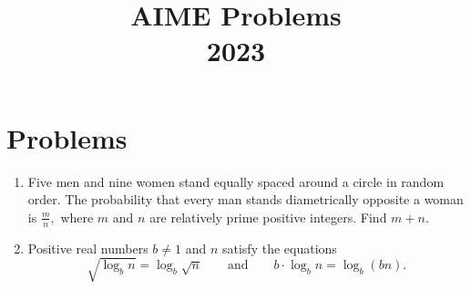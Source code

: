 \documentclass{article}
\title{AIME Problems \\ 2023}
\date{}
\begin{document}
\maketitle\thispagestyle{fancy}\newpage\section*{Problems}\begin{enumerate}[label=\arabic*., itemsep=0.5em]\item Five men and nine women stand equally spaced around a circle in random order. The probability that every man stands diametrically opposite a woman is $\frac{m}{n},$ where $m$ and $n$ are relatively prime positive integers. Find $m+n.$\par \vspace{0.5em}\item Positive real numbers $b \not= 1$ and $n$ satisfy the equations 
\begin{equation*}
\sqrt{\log_b n} = \log_b \sqrt{n} \qquad \text{and} \qquad b \cdot \log_b n = \log_b (bn).
\end{equation*}

\end{enumerate}
\end{document}
